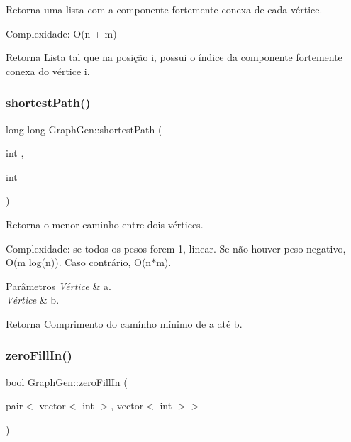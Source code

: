 Retorna uma lista com a componente fortemente conexa de cada vértice.

Complexidade\+: O(n + m) \begin{DoxyReturn}{Retorna}
Lista tal que na posição \textquotesingle{}i\textquotesingle{}, possui o índice da componente fortemente conexa do vértice \textquotesingle{}i\textquotesingle{}. 
\end{DoxyReturn}
\mbox{\label{classGraphGen_ad42fcde82e163baadcfaa02293242db5}} 
\subsubsection{\texorpdfstring{shortest\+Path()}{shortestPath()}}
{\footnotesize\ttfamily long long Graph\+Gen\+::shortest\+Path (\begin{DoxyParamCaption}\item[{int}]{,  }\item[{int}]{ }\end{DoxyParamCaption})}

Retorna o menor caminho entre dois vértices.

Complexidade\+: se todos os pesos forem 1, linear. Se não houver peso negativo, O(m log(n)). Caso contrário, O(n$\ast$m). 
\begin{DoxyParams}{Parâmetros}
{\em Vértice} & \textquotesingle{}a\textquotesingle{}. \\
\hline
{\em Vértice} & \textquotesingle{}b\textquotesingle{}. \\
\hline
\end{DoxyParams}
\begin{DoxyReturn}{Retorna}
Comprimento do camínho mínimo de \textquotesingle{}a\textquotesingle{} até \textquotesingle{}b\textquotesingle{}. 
\end{DoxyReturn}
\mbox{\label{classGraphGen_ad22d4dd7a1006663e1ba653c16b26e1a}} 
\subsubsection{\texorpdfstring{zero\+Fill\+In()}{zeroFillIn()}}
{\footnotesize\ttfamily bool Graph\+Gen\+::zero\+Fill\+In (\begin{DoxyParamCaption}\item[{pair$<$ vector$<$ int $>$, vector$<$ int $>$$>$}]{ }\end{DoxyParamCaption})\hspace{0.3cm}{\ttfamily [protected]}}

